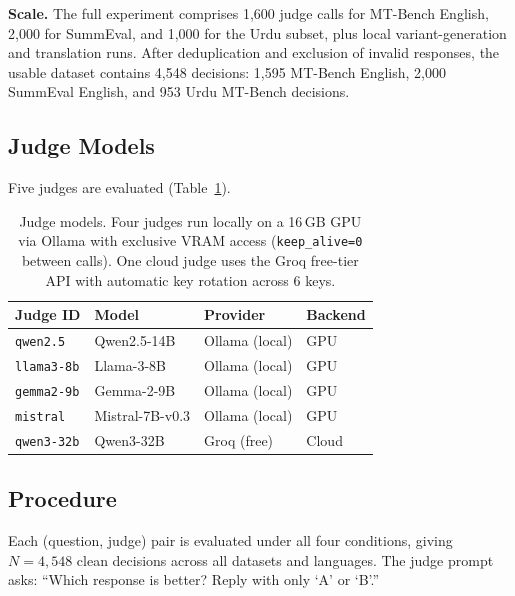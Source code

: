 \documentclass[10pt,conference]{IEEEtran}
\begin{document}
\textbf{Scale.} The full experiment comprises 1,600 judge calls for MT-Bench English, 2,000 for SummEval, and 1,000 for the Urdu subset, plus local variant-generation and translation runs. After deduplication and exclusion of invalid responses, the usable dataset contains 4,548 decisions: 1,595 MT-Bench English, 2,000 SummEval English, and 953 Urdu MT-Bench decisions.

\subsection{Judge Models}
Five judges are evaluated (Table~\ref{tab:judges}).

\begin{table}[t]
\caption{Judge models. Four judges run locally on a 16\,GB GPU via Ollama with exclusive VRAM access (\texttt{keep\_alive=0} between calls). One cloud judge uses the Groq free-tier API with automatic key rotation across 6 keys.}
\label{tab:judges}
\centering
\footnotesize
\begin{tabular}{@{}llll@{}}
\toprule
Judge ID & Model & Provider & Backend \\
\midrule
\texttt{qwen2.5} & Qwen2.5-14B & Ollama (local) & GPU \\
\texttt{llama3-8b} & Llama-3-8B & Ollama (local) & GPU \\
\texttt{gemma2-9b} & Gemma-2-9B & Ollama (local) & GPU \\
\texttt{mistral} & Mistral-7B-v0.3 & Ollama (local) & GPU \\
\texttt{qwen3-32b} & Qwen3-32B & Groq (free) & Cloud \\
\bottomrule
\end{tabular}
\end{table}

\subsection{Procedure}
Each (question, judge) pair is evaluated under all four conditions, giving $N=4{,}548$ clean decisions across all datasets and languages. The judge prompt asks: ``Which response is better? Reply with only `A' or `B'.''
\end{document}
